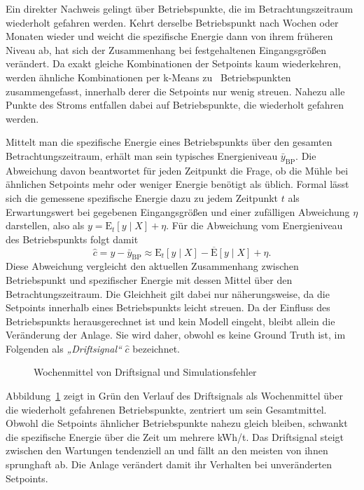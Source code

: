 %
Ein direkter Nachweis gelingt über Betriebspunkte, die im Betrachtungszeitraum wiederholt gefahren werden. Kehrt derselbe Betriebspunkt nach Wochen oder Monaten wieder und weicht die spezifische Energie dann von ihrem früheren Niveau ab, hat sich der Zusammenhang bei festgehaltenen Eingangsgrößen verändert. Da exakt gleiche Kombinationen der Setpoints kaum wiederkehren, werden ähnliche Kombinationen per k-Means zu \millCtxNOps~Betriebspunkten zusammengefasst, innerhalb derer die Setpoints nur wenig streuen. Nahezu alle Punkte des Stroms entfallen dabei auf Betriebspunkte, die wiederholt gefahren werden. \par
%
Mittelt man die spezifische Energie eines Betriebspunkts über den gesamten Betrachtungszeitraum, erhält man sein typisches Energieniveau $\bar{y}_{\mathrm{BP}}$. Die Abweichung davon beantwortet für jeden Zeitpunkt die Frage, ob die Mühle bei ähnlichen Setpoints mehr oder weniger Energie benötigt als üblich. Formal lässt sich die gemessene spezifische Energie dazu zu jedem Zeitpunkt $t$ als Erwartungswert bei gegebenen Eingangsgrößen und einer zufälligen Abweichung $\eta$ darstellen, also als $y = \mathrm{E}_t[y \mid X] + \eta$. Für die Abweichung vom Energieniveau des Betriebspunkts folgt damit
%
\begin{equation}
    \hat{c} = y - \bar{y}_{\mathrm{BP}} \approx \mathrm{E}_t[y \mid X] - \overline{\mathrm{E}}[y \mid X] + \eta \text{.}
    \label{eq:mill_drift_signal}
\end{equation}
%
Diese Abweichung vergleicht den aktuellen Zusammenhang zwischen Betriebspunkt und spezifischer Energie mit dessen Mittel über den Betrachtungszeitraum. Die Gleichheit gilt dabei nur näherungsweise, da die Setpoints innerhalb eines Betriebspunkts leicht streuen. Da der Einfluss des Betriebspunkts herausgerechnet ist und kein Modell eingeht, bleibt allein die Veränderung der Anlage. Sie wird daher, obwohl es keine Ground Truth ist, im Folgenden als \emph{„Driftsignal“} $\hat{c}$ bezeichnet. \par
%
\begin{figure}[tbp]
    \centering
    
    \caption{Wochenmittel von Driftsignal und Simulationsfehler}
    \label{fig:mill_context_op_recurrence}
\end{figure}
%
Abbildung~\ref{fig:mill_context_op_recurrence} zeigt in Grün den Verlauf des Driftsignals als Wochenmittel über die wiederholt gefahrenen Betriebspunkte, zentriert um sein Gesamtmittel. Obwohl die Setpoints ähnlicher Betriebspunkte nahezu gleich bleiben, schwankt die spezifische Energie über die Zeit um mehrere kWh/t. Das Driftsignal steigt zwischen den Wartungen tendenziell an und fällt an den meisten von ihnen sprunghaft ab. Die Anlage verändert damit ihr Verhalten bei unveränderten Setpoints. \par
